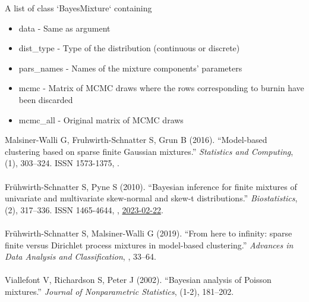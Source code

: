 \documentclass[a4paper]{book}
\begin{document}
%
\begin{Value}
A list of class `BayesMixture` containing
\begin{itemize}

\item{} data - Same as argument
\item{} dist\_type - Type of the distribution (continuous or discrete)
\item{} pars\_names - Names of the mixture components' parameters
\item{} mcmc - Matrix of MCMC draws where the rows corresponding to burnin have been discarded
\item{} mcmc\_all - Original matrix of MCMC draws

\end{itemize}

\end{Value}
%
\begin{References}\relax
Malsiner-Walli G, Fruhwirth-Schnatter S, Grun B (2016).
``Model-based clustering based on sparse finite Gaussian mixtures.''
\emph{Statistics and Computing}, (1), 303--324.
ISSN 1573-1375, .\\{}\\{}
Frühwirth-Schnatter S, Pyne S (2010).
``Bayesian inference for finite mixtures of univariate and multivariate skew-normal and skew-t distributions.''
\emph{Biostatistics}, (2), 317--336.
ISSN 1465-4644, , \url{2023-02-22}.\\{}\\{}
Frühwirth-Schnatter S, Malsiner-Walli G (2019).
``From here to infinity: sparse finite versus Dirichlet process mixtures in model-based clustering.''
\emph{Advances in Data Analysis and Classification}, , 33--64.\\{}\\{}
Viallefont V, Richardson S, Peter
J (2002).
``Bayesian analysis of Poisson mixtures.''
\emph{Journal of Nonparametric Statistics}, (1-2), 181--202.
\end{References}
%
\end{document}
